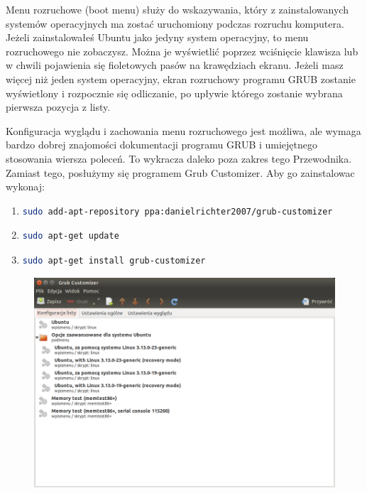 Menu rozruchowe (boot menu) służy do wskazywania, który z zainstalowanych systemów operacyjnych ma zostać uruchomiony podczas rozruchu komputera. Jeżeli zainstalowałeś Ubuntu jako jedyny system operacyjny, to menu rozruchowego nie zobaczysz. Można je wyświetlić poprzez wciśnięcie klawisza  lub \keys{\arrowkeydown} w chwili pojawienia się fioletowych pasów na krawędziach ekranu. Jeżeli masz więcej niż jeden system operacyjny, ekran rozruchowy programu GRUB zostanie wyświetlony i rozpocznie się odliczanie, po upływie którego zostanie wybrana pierwsza pozycja z listy.

Konfiguracja wyglądu i zachowania menu rozruchowego jest możliwa, ale wymaga bardzo dobrej znajomości dokumentacji programu GRUB i umiejętnego stosowania wiersza poleceń. To wykracza daleko poza zakres tego Przewodnika. Zamiast tego, posłużymy się programem \textcolor{ubuntu_orange}{Grub Customizer}. Aby go zainstalowac wykonaj:
\begin{enumerate}
\item
\begin{lstlisting}[language=bash]
sudo add-apt-repository ppa:danielrichter2007/grub-customizer
\end{lstlisting}
\item
\begin{lstlisting}[language=bash]
sudo apt-get update
\end{lstlisting}
\item
\begin{lstlisting}[language=bash]
sudo apt-get install grub-customizer
\end{lstlisting}
\end{enumerate}

\begin{figure}
	\vspace{-10pt}
	\includegraphics[width=\linewidth]{images/programy_grub_customizer.png}
\end{figure}

